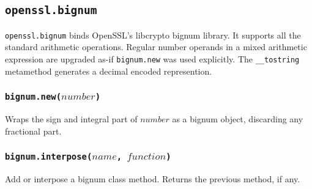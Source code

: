 \documentclass[11pt, oneside]{memoir}
\newcommand*{\fn}[1]{\texttt{#1}\xspace}
\newcommand*{\method}[1]{\texttt{#1}\xspace}
\newcommand*{\module}[1]{\texttt{#1}\xspace}
\newcounter{toccols}
\newenvironment{Module}[1]{
	\subsection{\texttt{#1}}
	\addtocontents{toc}{
		\protect\begin{multicols}{\value{toccols}}
	}
}{
	\addtocontents{toc}{\protect\end{multicols}}
}
\begin{document}
\begin{Module}{openssl.bignum}

\module{openssl.bignum} binds OpenSSL's libcrypto bignum library. It supports all the standard arithmetic operations. Regular number operands in a mixed arithmetic expression are upgraded as-if \method{bignum.new} was used explicitly. The \fn{\_\_tostring} metamethod generates a decimal encoded represention.

\subsubsection[\fn{bignum.new}]{\fn{bignum.new($number$)}}

Wraps the sign and integral part of $number$ as a bignum object, discarding any fractional part.

\subsubsection[\fn{bignum.interpose}]{\fn{bignum.interpose($name$, $function$)}}

Add or interpose a bignum class method. Returns the previous method, if any.

\end{Module}
\end{document}
